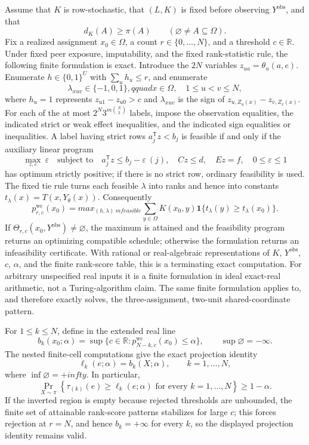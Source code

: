 Assume that \(K\) is row-stochastic, that \((L,K)\) is fixed before observing \(Y^{\mathrm{obs}}\), and that
\[
d_K(A)\geq \pi(A)\qquad
(\varnothing\neq A\subseteq\Omega).
\]
Fix a realized assignment \(x_0\in\Omega\), a count \(r\in\{0,\ldots,N\}\), and a threshold \(c\in\mathbb R\).  Under fixed peer exposure, imputability, and the fixed rank-statistic rule, the following finite formulation is exact.  Introduce the \(2N\) variables \(z_{ua}=\theta_u(a,e)\).  Enumerate \(h\in\{0,1\}^{U}\) with \(\sum_u h_u\leq r\), and enumerate
\[
\lambda_{xuv}\in\{-1,0,1\},qquad
x\in\Omega,\quad 1\leq u<v\leq N,
\]
where \(h_u=1\) represents \(z_{u1}-z_{u0}>c\) and \(\lambda_{xuv}\) is the sign of \(z_{u,Z_u(x)}-z_{v,Z_v(x)}\).  For each of the at most
\(2^N3^{m\binom N2}\) labels, impose the observation equalities, the indicated strict or weak effect inequalities, and the indicated sign equalities or inequalities.  A label having strict rows \(a_j^{\mathsf T}z<b_j\) is feasible if and only if the auxiliary linear program
\[
\max_{z,\varepsilon}\ \varepsilon
\quad\text{subject to}\quad
a_j^{\mathsf T}z\leq b_j-\varepsilon\ (j),
\quad Cz\leq d,
\quad Ez=f,
\quad 0\leq\varepsilon\leq1
\]
has optimum strictly positive; if there is no strict row, ordinary feasibility is used.  The fixed tie rule turns each feasible \(\lambda\) into ranks and hence into constants \(t_\lambda(x)=T(x,Y_\theta(x))\).  Consequently
\[
p^{\mathrm{wc}}_{r,c}(x_0)
=max_{(h,\lambda)\ {
m feasible}}
\sum_{y\in\Omega}K(x_0,y)
\mathbf 1\{t_\lambda(y)\geq t_\lambda(x_0)\}.
\]
If \(\Theta_{r,c}(x_0,Y^{\mathrm{obs}})\neq\varnothing\), the maximum is attained and the feasibility program returns an optimizing compatible schedule; otherwise the formulation returns an infeasibility certificate.  With rational or real-algebraic representations of \(K\), \(Y^{\mathrm{obs}}\), \(c\), \(\alpha\), and the finite rank-score table, this is a terminating exact computation.  For arbitrary unspecified real inputs it is a finite formulation in ideal exact-real arithmetic, not a Turing-algorithm claim.  The same finite formulation applies to, and therefore exactly solves, the three-assignment, two-unit shared-coordinate pattern.

For \(1\leq k\leq N\), define in the extended real line
\[
b_k(x_0;\alpha)
=\sup\{c\in\mathbb R:
p^{\mathrm{wc}}_{N-k,c}(x_0)\leq\alpha\},
\qquad \sup\varnothing=-\infty.
\]
The nested finite-cell computations give the exact projection identity
\[
\ell_k(e;\alpha)=b_k(X;\alpha),
\qquad k=1,\ldots,N,
\]
where \(\inf\varnothing=+infty\).  In particular,
\[
\Pr_{X\sim\pi}\!\left\{
\tau_{(k)}(e)\geq\ell_k(e;\alpha)
\text{ for every }k=1,\ldots,N
\right\}\geq1-\alpha.
\]
If the inverted region is empty because rejected thresholds are unbounded, the finite set of attainable rank-score patterns stabilizes for large \(c\); this forces rejection at \(r=N\), and hence \(b_k=+\infty\) for every \(k\), so the displayed projection identity remains valid.


